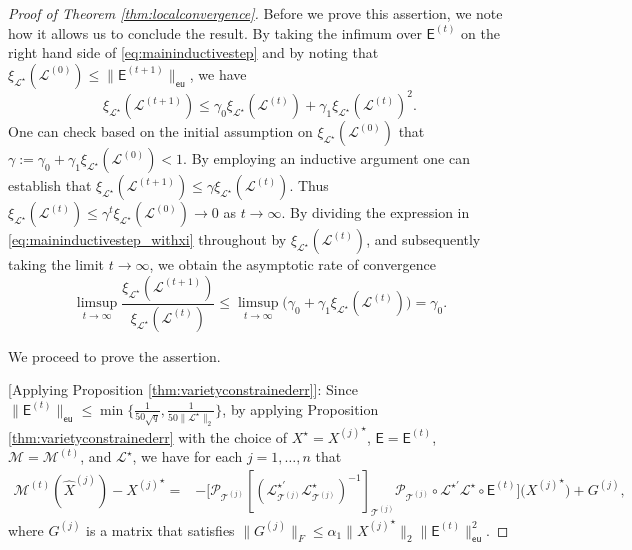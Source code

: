 \documentclass[11pt,letterpaper]{article}
\renewcommand{\L}{\mathcal{L}}
\newcommand{\ct}{\mathcal{T}}
\newcommand{\cp}{\mathcal{P}}
\newcommand{\sfe}{\mathsf{E}}
\newcommand{\err}{G}
\newcommand{\eu}{\mathsf{eu}}
\begin{document}
\begin{proof}[Proof of Theorem \ref{thm:localconvergence}]
	Before we prove this assertion, we note how it allows us to conclude the result.  By taking the infimum over $\sfe^{(t)}$ on the right hand side of \eqref{eq:maininductivestep} and by noting that $\xi_{\L^\star}(\L^{(0)}) \leq \|\sfe^{(t+1)}\|_{\eu}$, we have
	\begin{equation} \label{eq:maininductivestep_withxi}
	\xi_{\mathcal{L}^{\star}}(\mathcal{L}^{(t+1)}) \leq \gamma_0 \xi_{\mathcal{L}^{\star}}(\mathcal{L}^{(t)}) + \gamma_1 \xi_{\mathcal{L}^{\star}}(\mathcal{L}^{(t)})^2.
	\end{equation}
	One can check based on the initial assumption on $\xi_{\mathcal{L}^{\star}}(\mathcal{L}^{(0)})$ that $\gamma:=\gamma_0 + \gamma_1 \xi_{\mathcal{L}^{\star}}(\mathcal{L}^{(0)}) < 1$.  By employing an inductive argument one can establish that $\xi_{\mathcal{L}^{\star}}(\mathcal{L}^{(t+1)}) \leq \gamma \xi_{\mathcal{L}^{\star}}(\mathcal{L}^{(t)})$.  Thus $\xi_{\mathcal{L}^{\star}}(\mathcal{L}^{(t)}) \leq \gamma^{t} \xi_{\mathcal{L}^{\star}}(\mathcal{L}^{(0)}) \rightarrow 0$ as $t \rightarrow \infty$.  By dividing the expression in \eqref{eq:maininductivestep_withxi} throughout by $\xi_{\mathcal{L}^{\star}}(\mathcal{L}^{(t)})$, and subsequently taking the limit $t\rightarrow \infty$, we obtain the asymptotic rate of convergence
	\begin{equation*}
	\limsup_{t \rightarrow \infty} \frac{\xi_{\mathcal{L}^{\star}}(\mathcal{L}^{(t+1)})}{\xi_{\mathcal{L}^{\star}}(\mathcal{L}^{(t)})} \leq \limsup_{t\rightarrow \infty} \bigl(\gamma_0 + \gamma_1 \xi_{\mathcal{L}^{\star}}(\mathcal{L}^{(t)}) \bigr) = \gamma_0.
	\end{equation*}
	
	We proceed to prove the assertion.
		
	[Applying Proposition \ref{thm:varietyconstrainederr}]: Since $\|\sfe^{(t)}\|_{\eu} \leq \min\{\frac{1}{50\sqrt{q}}, \frac{1}{50\|\mathcal{L}^{\star}\|_{2}} \}$, by applying Proposition \ref{thm:varietyconstrainederr} with the choice of $X^{\star} = {X^{(j)}}^{\star}$,  $\sfe = \sfe^{(t)}$, $\mathcal{M} = \mathcal{M}^{(t)}$, and $\mathcal{L}^{\star}$, we have for each $j = 1, \dots, n$ that
\begin{equation} \label{eq:proofvaropt}
\begin{aligned}
	\mathcal{M}^{(t)} (\hat{X}^{(j)}) - {X^{(j)}}^{\star} = & - \biggl[\cp_{\ct^{(j)}} [(\mathcal{L}^{\star\prime}_{\ct^{(j)}}\mathcal{L}^{\star}_{\ct^{(j)}})^{-1}]_{\ct^{(j)}} \cp_{\ct^{(j)}} \circ \mathcal{L}^{\star\prime} \mathcal{L}^{\star} \circ \sfe^{(t)} \biggr] \bigl({X^{(j)}}^{\star}\bigr)+ \err^{(j)},
\end{aligned}
\end{equation}
where $\err^{(j)}$ is a matrix that satisfies $\|\err^{(j)}\|_F \leq \alpha_1 \|{X^{(j)}}^{\star}\|_2\|\sfe^{(t)}\|_{\eu}^2$.
	

\end{proof}
\end{document}
